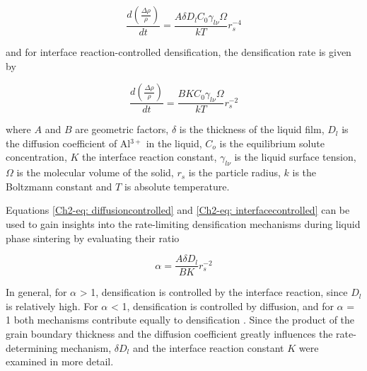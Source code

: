 \begin{equation}
\label{Ch2-eq: diffusioncontrolled}
\frac{d\left( \frac{\Delta \rho}{\rho} \right)}{dt} = \frac{A \delta D_{l} C_{0} \gamma_{l \nu} \Omega}{kT} r_{s}^{-4}
\end{equation}

\noindent and for interface reaction-controlled densification, the densification rate is given by 

\begin{equation}
\label{Ch2-eq: interfacecontrolled}
\frac{d\left( \frac{\Delta \rho}{\rho} \right)}{dt} = \frac{B K C_{0} \gamma_{l \nu} \Omega}{kT} r_{s}^{-2}
\end{equation}

\noindent where $A$ and $B$ are geometric factors, $\delta$ is the thickness of the liquid film, $D_{l}$ is the diffusion coefficient of Al$^{3+}$ in the liquid, $C_{o}$ is the equilibrium solute concentration, $K$ the interface reaction constant, $\gamma_{l \nu}$ is the liquid surface tension, $\Omega$ is the molecular volume of the solid, $r_{s}$ is the particle radius, $k$ is the Boltzmann constant and $T$ is absolute temperature.

Equations \ref{Ch2-eq: diffusioncontrolled} and \ref{Ch2-eq: interfacecontrolled} can be used to gain insights into the rate-limiting densification mechanisms during liquid phase sintering by evaluating their ratio \cite{Kwon1990,Kwon1991}

\begin{equation}
\label{Ch2-eq: densmech}
\alpha = \frac{A \delta D_{l}}{BK}r_{s}^{-2}
\end{equation}

In general, for $\alpha$ > 1, densification is controlled by the interface reaction, since $D_{l}$ is relatively high.  For $\alpha$ < 1, densification is controlled by diffusion, and for $\alpha$ = 1 both mechanisms contribute equally to densification \cite{Kwon1991}. Since the product of the grain boundary thickness and the diffusion coefficient greatly influences the rate-determining mechanism, $\delta D_{l}$ and the interface reaction constant $K$ were examined in more detail. 

